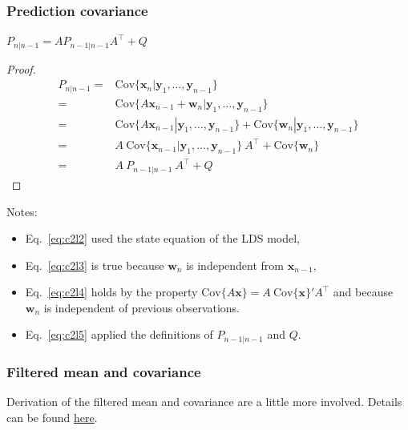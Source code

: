 \begin{frame}
    \frametitle{Prediction covariance}
\scriptsize
\begin{claim}
    $P_{n|n-1}=AP_{n-1|n-1}A^\intercal+Q$
    \label{claim:predictionCov}
\end{claim}

\begin{proof}
    \begin{align}
        P_{n|n-1}=&\text{Cov}\{\mathbf{x}_n|\mathbf{y}_1,\ldots,\mathbf{y}_{n-1}\}\nonumber\\
                 =&\text{Cov}\{A\mathbf{x}_{n-1}+\mathbf{w}_n|\mathbf{y}_1,\ldots,\mathbf{y}_{n-1}\}\label{eq:c2l2}\\
                 =&\text{Cov}\{A\mathbf{x}_{n-1}|\mathbf{y}_1,\ldots,\mathbf{y}_{n-1}\}+\text{Cov}\{\mathbf{w}_n|\mathbf{y}_1,\ldots,\mathbf{y}_{n-1}\}\label{eq:c2l3}\\
                 =&A\ \text{Cov}\{\mathbf{x}_{n-1}|\mathbf{y}_1,\ldots,\mathbf{y}_{n-1}\}\ A^\intercal+\text{Cov}\{\mathbf{w}_n\}\label{eq:c2l4}\\
                 =&A\ P_{n-1|n-1}\ A^\intercal+Q\label{eq:c2l5}
    \end{align}
\end{proof}

Notes:

\begin{itemize}
    \item Eq.~\ref{eq:c2l2} used the state equation of the LDS model,
    \item Eq.~\ref{eq:c2l3} is true because $\mathbf{w}_n$ is independent from
        $\mathbf{x}_{n-1}$,
    \item Eq.~\ref{eq:c2l4} holds by the property
        $\text{Cov}\{A\mathbf{x}\}=A\ \text{Cov}\{\mathbf{x}\}' A^\intercal$ and
        because $\mathbf{w}_n$ is independent of previous observations.
    \item Eq.~\ref{eq:c2l5} applied the definitions of $P_{n-1|n-1}$ and $Q$.
\end{itemize}
\end{frame}

\begin{frame}
    \frametitle{Filtered mean and covariance}

    Derivation of the filtered mean and covariance are a little more involved.
    Details can be found
    \href{https://github.com/joacorapela/ssm/blob/master/docs/inference/ldsInference.pdf}{here}.

\end{frame}

